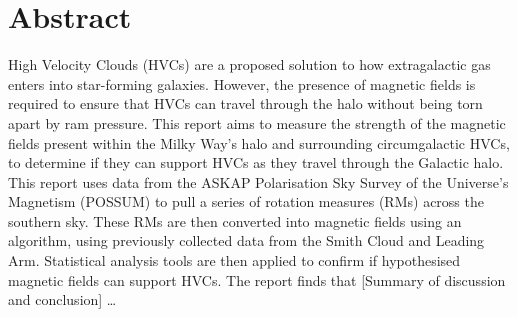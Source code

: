 \chapter*{Abstract}
\vspace{-1em}

High Velocity Clouds (HVCs) are a proposed solution to how extragalactic gas enters into star-forming galaxies. However, the presence of magnetic fields is required to ensure that HVCs can travel through the halo without being torn apart by ram pressure. This report aims to measure the strength of the magnetic fields present within the Milky Way’s halo and surrounding circumgalactic HVCs, to determine if they can support HVCs as they travel through the Galactic halo. This report uses data from the ASKAP Polarisation Sky Survey of the Universe’s Magnetism (POSSUM) to pull a series of rotation measures (RMs) across the southern sky. These RMs are then converted into magnetic fields using an algorithm, using previously collected data from the Smith Cloud and Leading Arm. Statistical analysis tools are then applied to confirm if hypothesised magnetic fields can support HVCs. The report finds that [Summary of discussion and conclusion] …


